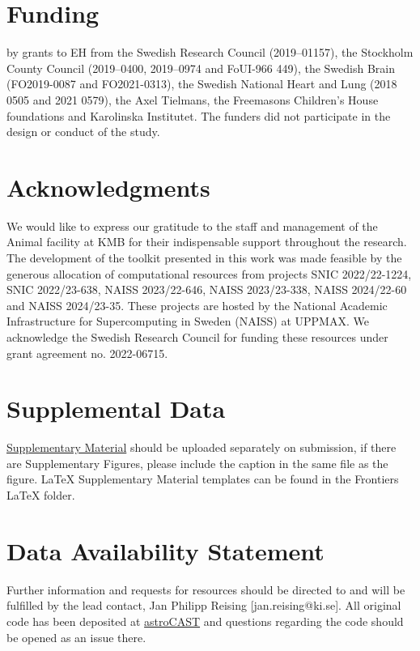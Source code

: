 \documentclass[utf8]{FrontiersinHarvard}
\begin{document}
    \section*{Funding}
     by grants to EH from the Swedish Research Council (2019–01157), the Stockholm County Council (2019–0400, 2019–0974 and FoUI-966 449), the Swedish Brain (FO2019-0087 and FO2021-0313), the Swedish National Heart and Lung (2018 0505 and 2021 0579), the Axel Tielmans, the Freemasons Children's House foundations and Karolinska Institutet. The funders did not participate in the design or conduct of the study.

    \section*{Acknowledgments}
    We would like to express our gratitude to the staff and management of the Animal facility at KMB for their indispensable support throughout the research. The development of the toolkit presented in this work was made feasible by the generous allocation of computational resources from projects SNIC 2022/22-1224, SNIC 2022/23-638, NAISS 2023/22-646, NAISS 2023/23-338, NAISS 2024/22-60 and NAISS 2024/23-35. These projects are hosted by the National Academic Infrastructure for Supercomputing in Sweden (NAISS) at UPPMAX. We acknowledge the Swedish Research Council for funding these resources under grant agreement no. 2022-06715.

    \section*{Supplemental Data}
    \href{http://home.frontiersin.org/about/author-guidelines#SupplementaryMaterial}{Supplementary Material} should
    be uploaded separately on submission, if there are Supplementary Figures, please include the caption in the same
    file as the figure. LaTeX Supplementary Material templates can be found in the Frontiers LaTeX folder.

    \section*{Data Availability Statement}
    Further information and requests for resources  should be directed to and will be fulfilled by the lead contact, Jan Philipp Reising [jan.reising@ki.se]. All original code has been deposited at \href{https://github.com/janreising/astroCAST}{astroCAST} and questions regarding the code should be opened as an issue there.
\end{document}
